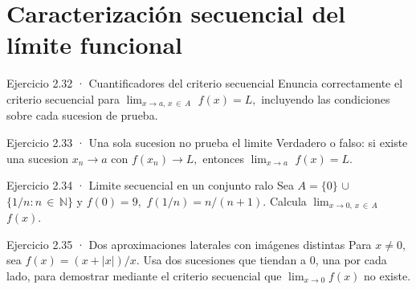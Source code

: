 \documentclass[10pt,a4paper,oneside,openany]{book}
\begin{document}
\section{Caracterización secuencial del límite funcional}
\begin{PSevenExerciseFixed}{Ejercicio 2.32 · Cuantificadores del criterio secuencial}
Enuncia correctamente el criterio secuencial para \(\lim_{x\to a,\,x\,\in \,A}\) \(f(x)=L,\) incluyendo las condiciones sobre cada sucesion de prueba.
\end{PSevenExerciseFixed}
\begin{PSevenExerciseFixed}{Ejercicio 2.33 · Una sola sucesion no prueba el limite}
Verdadero o falso: si existe una sucesion \(x_n\to a\) con \(f(x_n)\to L,\) entonces \(\lim_{x\to a}\) \(f(x)=L\).
\end{PSevenExerciseFixed}
\begin{PSevenExerciseFixed}{Ejercicio 2.34 · Limite secuencial en un conjunto ralo}
Sea \(A=\{0\}\) \(\cup \) \(\{1/n:n\,\in \,\mathbb{N}\}\) y \(f(0)=9,\) \(f(1/n)=n/(n+1)\). Calcula \(\lim_{x\to 0,\,x\,\in \,A}\) \(f(x)\).
\end{PSevenExerciseFixed}
\begin{PSevenExerciseFixed}{Ejercicio 2.35 · Dos aproximaciones laterales con imágenes distintas}
Para \(x\ne0\), sea \(f(x)=(x+|x|)/x\). Usa dos sucesiones que tiendan a \(0\), una por cada lado, para demostrar mediante el criterio secuencial que \(\lim_{x\to0}f(x)\) no existe.
\end{PSevenExerciseFixed}
\end{document}
